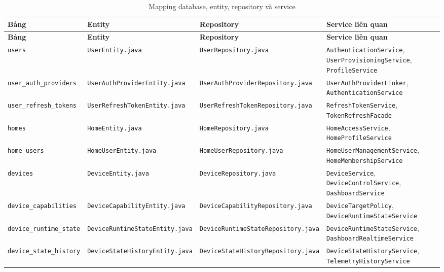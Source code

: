 {\scriptsize
\setlength{\tabcolsep}{2pt}
\renewcommand{\arraystretch}{1.12}
\begin{longtable}{|p{}|p{}|p{}|p{}|}
\caption{Mapping database, entity, repository và service}\\
\hline
\textbf{Bảng} & \textbf{Entity} & \textbf{Repository} & \textbf{Service liên quan} \\
\hline
\endfirsthead
\hline
\textbf{Bảng} & \textbf{Entity} & \textbf{Repository} & \textbf{Service liên quan} \\
\hline
\endhead
\texttt{users} & \texttt{UserEntity.java} & \texttt{UserRepository.java} & \texttt{AuthenticationService}, \texttt{UserProvisioningService}, \texttt{ProfileService} \\
\hline
\texttt{user\_auth\_providers} & \texttt{UserAuthProviderEntity.java} & \texttt{UserAuthProvider}\newline\texttt{Repository.java} & \texttt{UserAuthProviderLinker}, \texttt{AuthenticationService} \\
\hline
\texttt{user\_refresh\_tokens} & \texttt{UserRefreshTokenEntity.java} & \texttt{UserRefreshToken}\newline\texttt{Repository.java} & \texttt{RefreshTokenService}, \texttt{TokenRefreshFacade} \\
\hline
\texttt{homes} & \texttt{HomeEntity.java} & \texttt{HomeRepository.java} & \texttt{HomeAccessService}, \texttt{HomeProfileService} \\
\hline
\texttt{home\_users} & \texttt{HomeUserEntity.java} & \texttt{HomeUserRepository.java} & \texttt{HomeUserManagementService}, \texttt{HomeMembershipService} \\
\hline
\texttt{devices} & \texttt{DeviceEntity.java} & \texttt{DeviceRepository.java} & \texttt{DeviceService}, \texttt{DeviceControlService}, \texttt{DashboardService} \\
\hline
\texttt{device\_capabilities} & \texttt{DeviceCapabilityEntity.java} & \texttt{DeviceCapability}\newline\texttt{Repository.java} & \texttt{DeviceTargetPolicy}, \texttt{DeviceRuntimeStateService} \\
\hline
\texttt{device\_runtime\_state} & \texttt{DeviceRuntimeStateEntity.java} & \texttt{DeviceRuntimeState}\newline\texttt{Repository.java} & \texttt{DeviceRuntimeStateService}, \texttt{DashboardRealtimeService} \\
\hline
\texttt{device\_state\_history} & \texttt{DeviceStateHistoryEntity.java} & \texttt{DeviceStateHistory}\newline\texttt{Repository.java} & \texttt{DeviceStateHistoryService}, \texttt{TelemetryHistoryService} \\

\end{longtable}}
